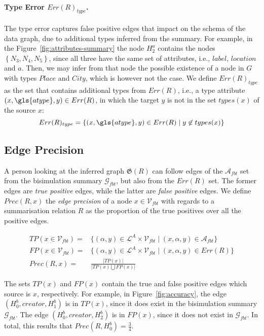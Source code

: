 \paragraph{Type Error $Err(R)_{type}$.}

The type error captures false positive edges that impact on the schema of the data graph, due to additional types inferred from the summary.
For example, in the Figure~\ref{fig:attributes-summary} the node $H^a_2$ contains the nodes $\left\lbrace N_3, N_4, N_5 \right\rbrace$, since all three have the same set of attributes, i.e., $label$, $location$ and $a$. Then, we may infer from that node the possible existence of a node in $G$ with types $Place$ and $City$, which is however not the case. We define $Err(R)_{type}$ as the set that contains additional types from $Err(R)$, i.e., a type attribute $(x, \gls{atype}, y) \in Err(R)$, in which the target $y$ is not in the set $types(x)$ of the source $x$:
$$
Err(R)_{type} = \left\lbrace (x, \gls{atype}, y) \in Err(R) \mid y \not \in types(x) \right\rbrace
$$

\subsection{Edge Precision}
\label{sec:edge-precision}

A person looking at the inferred graph $\mathfrak{G}(R)$ can follow edges of the $\mathcal{A}_{fbt}$ set from the bisimulation summary $\mathcal{G}_{fbt}$, but also from the $Err(R)$ set. The former edges are \emph{true positive} edges, while the latter are \emph{false positive} edges. We define $Prec(R, x)$ the \emph{edge precision} of a node $x \in \mathcal{V}_{fbt}$ with regards to a summarisation relation $R$ as the proportion of the true positives over all the positive edges.

$$
\begin{aligned}
TP(x \in \mathcal{V}_{fbt}) = & \{ (\alpha, y) \in \mathcal{L}^A \times \mathcal{V}_{fbt} \mid (x, \alpha, y) \in \mathcal{A}_{fbt} \} \\
FP(x \in \mathcal{V}_{fbt}) = & \{ (\alpha, y) \in \mathcal{L}^A \times \mathcal{V}_{fbt} \mid (x, \alpha, y) \in Err(R) \} \\
Prec(R, x) = & \frac{\vert TP(x) \vert}{\vert TP(x) \bigcup FP(x) \vert}
\end{aligned}
$$

The sets $TP(x)$ and $FP(x)$ contain the true and false positive edges which source is $x$, respectively. For example, in Figure~\ref{fig:accuracy}, the edge $(H^b_0, creator, H^b_1)$ is in $TP(x)$, since it does exist in the bisimulation summary $\mathcal{G}_{fbt}$. The edge $(H^b_0, creator, H^b_2)$ is in $FP(x)$, since it does not exist in $\mathcal{G}_{fbt}$. In total, this results that $Prec\left(R, H^b_0\right) = \frac{3}{4}$.

